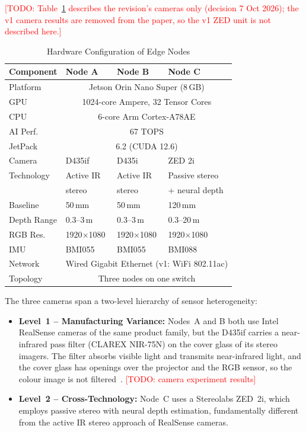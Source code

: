 \documentclass[journal]{IEEEtran}
\newcommand{\todo}[1]{\textcolor{red}{[TODO: #1]}}
\begin{document}
\todo{Table~\ref{tab:hardware} describes the revision's cameras only (decision 7 Oct 2026); the v1 camera results are removed from the paper, so the v1 ZED unit is not described here.}

\begin{table}[t]
\centering
\caption{Hardware Configuration of Edge Nodes}
\label{tab:hardware}
\begin{tabular}{@{}llll@{}}
\toprule
\textbf{Component} & \textbf{Node A} & \textbf{Node B} & \textbf{Node C} \\
\midrule
Platform & \multicolumn{3}{c}{Jetson Orin Nano Super (8\,GB)} \\
GPU & \multicolumn{3}{c}{1024-core Ampere, 32 Tensor Cores} \\
CPU & \multicolumn{3}{c}{6-core Arm Cortex-A78AE} \\
AI Perf. & \multicolumn{3}{c}{67 TOPS} \\
JetPack & \multicolumn{3}{c}{6.2 (CUDA 12.6)} \\
\midrule
Camera & D435if & D435i & ZED 2i \\
Technology & Active IR & Active IR & Passive stereo \\
 & stereo & stereo & + neural depth \\
Baseline & 50\,mm & 50\,mm & 120\,mm \\
Depth Range & 0.3--3\,m & 0.3--3\,m & 0.3--20\,m \\
RGB Res. & 1920$\times$1080 & 1920$\times$1080 & 1920$\times$1080 \\
IMU & BMI055 & BMI055 & BMI088 \\
\midrule
Network & \multicolumn{3}{c}{Wired Gigabit Ethernet (v1: WiFi 802.11ac)} \\
Topology & \multicolumn{3}{c}{Three nodes on one switch} \\
\bottomrule
\end{tabular}
\end{table}

The three cameras span a two-level hierarchy of sensor heterogeneity:

\begin{itemize}
    \item \textbf{Level~1 -- Manufacturing Variance:} Nodes~A and B both use Intel RealSense cameras of the same product family, but the D435if carries a near-infrared pass filter (CLAREX NIR-75N) on the cover glass of its stereo imagers. The filter absorbs visible light and transmits near-infrared light, and the cover glass has openings over the projector and the RGB sensor, so the colour image is not filtered~\cite{intel2025d400datasheet}. \todo{camera experiment results}

    \item \textbf{Level~2 -- Cross-Technology:} Node~C uses a Stereolabs ZED~2i, which employs passive stereo with neural depth estimation, fundamentally different from the active IR stereo approach of RealSense cameras.
\end{itemize}
\end{document}
